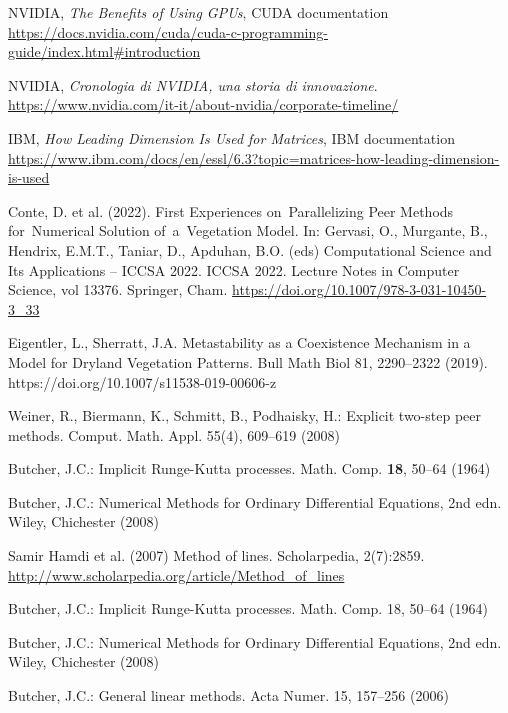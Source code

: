 \begin{thebibliography}{30}

 NVIDIA, \emph{The Benefits of Using GPUs}, CUDA documentation \url{https://docs.nvidia.com/cuda/cuda-c-programming-guide/index.html#introduction}

 NVIDIA, \emph{Cronologia di NVIDIA, una storia di innovazione}. \url{https://www.nvidia.com/it-it/about-nvidia/corporate-timeline/}

 IBM, \emph{How Leading Dimension Is Used for Matrices}, IBM documentation \url{https://www.ibm.com/docs/en/essl/6.3?topic=matrices-how-leading-dimension-is-used}

 Conte, D. et al. (2022). First Experiences on Parallelizing Peer Methods for Numerical Solution of a Vegetation Model. In: Gervasi, O., Murgante, B., Hendrix, E.M.T., Taniar, D., Apduhan, B.O. (eds) Computational Science and Its Applications – ICCSA 2022. ICCSA 2022. Lecture Notes in Computer Science, vol 13376. Springer, Cham. \url{https://doi.org/10.1007/978-3-031-10450-3_33}

 Eigentler, L., Sherratt, J.A. Metastability as a Coexistence Mechanism in a Model for Dryland Vegetation Patterns. Bull Math Biol 81, 2290–2322 (2019). https://doi.org/10.1007/s11538-019-00606-z

 Weiner, R., Biermann, K., Schmitt, B., Podhaisky, H.: Explicit two-step peer methods.
Comput. Math. Appl. 55(4), 609–619 (2008)

 Butcher, J.C.: Implicit Runge-Kutta processes. Math. Comp. \textbf{18}, 50–64 (1964)

 Butcher, J.C.: Numerical Methods for Ordinary Differential Equations, 2nd edn. Wiley, Chichester (2008)

 Samir Hamdi et al. (2007) Method of lines. Scholarpedia, 2(7):2859. \url{http://www.scholarpedia.org/article/Method_of_lines}

 Butcher, J.C.: Implicit Runge-Kutta processes. Math. Comp. 18, 50–64 (1964)

 Butcher, J.C.: Numerical Methods for Ordinary Differential Equations, 2nd edn.
Wiley, Chichester (2008)

 Butcher, J.C.: General linear methods. Acta Numer. 15, 157–256 (2006)


\end{thebibliography}
